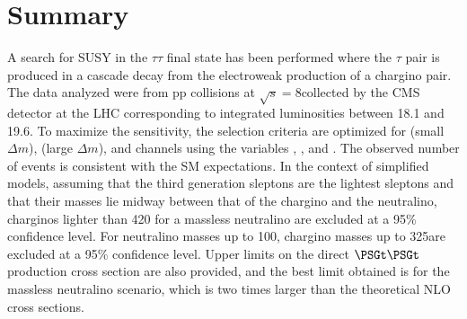 \section{Summary}
\label{sect:conclusion}
A search for SUSY in the $\tau\tau$ final state has been performed where the
$\tau$ pair is produced in a cascade decay from the electroweak production of a chargino pair.  The data analyzed were from pp collisions
at $\sqrt{s} = 8$\TeV collected by the CMS detector at the LHC corresponding to integrated luminosities between 18.1 and 19.6\fbinv.
To maximize the sensitivity, the selection criteria are optimized for \tauTau (small $\Delta m$),
\tauTau (large $\Delta m$), and \leptonTau channels using the variables \mttwo, \tauMT, and \SumMT.
The observed number of events is consistent with the SM expectations.
In the context of simplified models, assuming that the third generation
sleptons are the lightest sleptons and that their masses lie midway between
that of the chargino and the neutralino, charginos lighter than 420\GeV
for a massless neutralino are excluded at a 95\% confidence level.
For neutralino masses up to 100\GeV, chargino masses up to 325\GeV are excluded
at a 95\% confidence level.
Upper limits on the direct $\PSGt\PSGt$ production cross section are also provided,
and the best limit obtained is for the massless neutralino scenario, which is two times
larger than the theoretical NLO cross sections.

